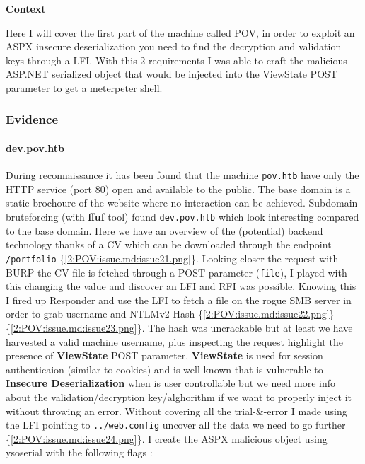 \documentclass[a4paper]{article}
\newcommand{\passthrough}[1]{\colorbox{code}{\lstset{mathescape=false}#1}}
\begin{document}
\textbf{Context}

Here I will cover the first part of the machine called POV, in order to exploit an ASPX insecure deserialization
you need to find the decryption and validation keys through a LFI. With this 2 requirements I was able to craft
the malicious ASP.NET serialized object that would be injected into the ViewState POST parameter to get a meterpeter
shell.


    \subsubsection{Evidence}

          \paragraph{dev.pov.htb}

      During reconnaissance it has been found that the machine \passthrough{\lstinline!pov.htb!} have only the HTTP service (port 80) open and available to the public. The base
domain is a static brochoure of the website where no interaction can be achieved. Subdomain bruteforcing (with \textbf{ffuf} tool) found \passthrough{\lstinline!dev.pov.htb!} which
look interesting compared to the base domain. Here we have an overview of the (potential) backend technology thanks of a CV which can be downloaded through
the endpoint \passthrough{\lstinline!/portfolio!} \{\ref{2:POV:issue.md:issue21.png}\}. Looking closer the request with BURP the CV file is fetched through a POST parameter (\passthrough{\lstinline!file!}),
I played with this changing the value and discover an LFI and RFI was possible. Knowing this I fired up Responder and use the LFI to fetch a file on the rogue
SMB server in order to grab username and NTLMv2 Hash \{\ref{2:POV:issue.md:issue22.png}\} \{\ref{2:POV:issue.md:issue23.png}\}.
The hash was uncrackable but at least we have harvested a valid machine username, plus inspecting the request highlight the presence of \textbf{ViewState} POST parameter.
\textbf{ViewState} is used for session authenticaion (similar to cookies) and is well known that is vulnerable to \textbf{Insecure Deserialization} when is user controllable but
we need more info about the validation/decryption key/alghorithm if we want to properly inject it without throwing an error. Without covering all the trial-\&-error I made
using the LFI pointing to \passthrough{\lstinline!../web.config!} uncover all the data we need to go further \{\ref{2:POV:issue.md:issue24.png}\}. I create the ASPX malicious object using ysoserial
with the following flags :
\end{document}
